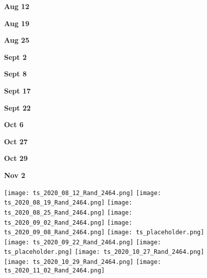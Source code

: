 \documentclass{article}
\begin{document}
\begin{figure}[t]
	\centering
	 \begin{minipage}{0.082\textwidth}
	 \centering
	 \textbf{Aug 12}
	 \end{minipage}
	 \begin{minipage}{0.082\textwidth}
	 	 \centering
	 \textbf{Aug 19}
	 \end{minipage}
	 \begin{minipage}{0.082\textwidth}
	 	 \centering
	 \textbf{Aug 25}
	 \end{minipage}
	 \begin{minipage}{0.082\textwidth}
	 	 \centering
	 \textbf{Sept 2}
	 \end{minipage}
	 \begin{minipage}{0.082\textwidth}
	 	 \centering
	 \textbf{Sept 8}
	 \end{minipage}
	 \begin{minipage}{0.082\textwidth}
	 	 \centering
	 \textbf{Sept 17}
	 \end{minipage}
	 \begin{minipage}{0.082\textwidth}
	 	 \centering
	 \textbf{Sept 22}
	 \end{minipage}
	 \begin{minipage}{0.082\textwidth}
	 	 \centering
	 \textbf{Oct 6}
	 \end{minipage}
	 \begin{minipage}{0.082\textwidth}
	 	 \centering
	 \textbf{Oct 27}
	 \end{minipage}
	 \begin{minipage}{0.082\textwidth}
	 	 \centering
	 \textbf{Oct 29}
	 \end{minipage}
	 \begin{minipage}{0.082\textwidth}
	 \centering
	 \textbf{Nov 2}
	 \end{minipage}
	 
	
    \texttt{[image: ts\_2020\_08\_12\_Rand\_2464.png]}
    \texttt{[image: ts\_2020\_08\_19\_Rand\_2464.png]}
    \texttt{[image: ts\_2020\_08\_25\_Rand\_2464.png]}
    \texttt{[image: ts\_2020\_09\_02\_Rand\_2464.png]}
    \texttt{[image: ts\_2020\_09\_08\_Rand\_2464.png]}
    \texttt{[image: ts\_placeholder.png]}
    \texttt{[image: ts\_2020\_09\_22\_Rand\_2464.png]}
    \texttt{[image: ts\_placeholder.png]}
    \texttt{[image: ts\_2020\_10\_27\_Rand\_2464.png]}
    \texttt{[image: ts\_2020\_10\_29\_Rand\_2464.png]}
    \texttt{[image: ts\_2020\_11\_02\_Rand\_2464.png]}


\end{figure}
\end{document}
